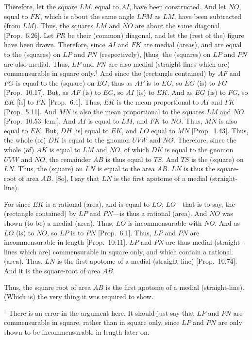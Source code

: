 \begin{Parallel}{}{}
{Therefore, let the square $LM$, equal to $AI$, have been constructed.
And let $NO$, equal to $FK$, which is about the
same angle $LPM$ as $LM$, have been subtracted (from $LM$).
Thus, the squares $LM$ and $NO$ are about the same diagonal
[Prop.~6.26]. Let $PR$ be their (common) diagonal, and
let the (rest of the) figure have been drawn. Therefore, since $AI$ and $FK$
are medial (areas), and are equal to the (squares) on $LP$ and $PN$
(respectively), [thus] the (squares) on $LP$ and $PN$ are also medial.
Thus, $LP$ and $PN$ are  also medial (straight-lines which are)
commensurable in square only.$^\dag$ And since the (rectangle contained) by
$AF$ and $FG$ is equal to the (square) on $EG$, thus as $AF$ is to $EG$, so $EG$ (is) to $FG$ [Prop.~10.17]. But, as
$AF$ (is) to $EG$, so $AI$ (is) to $EK$. And as $EG$ (is) to $FG$, so
$EK$ [is] to $FK$ [Prop.~6.1]. Thus, $EK$ is the mean proportional to $AI$ and $FK$ [Prop.~5.11].
And $MN$ is also the mean proportional to the squares $LM$ and $NO$ [Prop.~10.53~lem.]. 
And $AI$ is equal to $LM$, and $FK$ to $NO$. 
Thus, $MN$ is also equal to
$EK$. But, $DH$ [is] equal to $EK$, and $LO$ equal to $MN$ [Prop.~1.43]. Thus, the whole  (of) $DK$ is equal to
the gnomon $UVW$ and $NO$. Therefore, since the whole (of) $AK$
is equal to $LM$ and $NO$, of which $DK$ is equal to the
gnomon $UVW$ and $NO$,  the remainder $AB$ is thus equal to $TS$.
And $TS$ is the (square) on $LN$. Thus, the (square) on $LN$
is equal to the area $AB$. $LN$ is thus the square-root of area $AB$.
[So], I say that $LN$ is the first apotome of a medial (straight-line).

For since $EK$ is a rational (area), and is equal to $LO$, $LO$---that is to
say, the (rectangle contained) by $LP$ and $PN$---is thus
a rational (area). And $NO$ was shown (to be) a medial (area). Thus,
$LO$ is incommensurable  with $NO$. And as $LO$ (is) to $NO$,
so $LP$ is to $PN$ [Prop.~6.1]. Thus,  $LP$ and
$PN$ are incommensurable in length [Prop.~10.11]. 
$LP$ and $PN$ are thus medial (straight-lines which are) commensurable
in square only, and which contain a rational (area). Thus, $LN$ is the
first apotome of a medial (straight-line) [Prop.~10.74]. And it is the square-root of area $AB$.

Thus, the square root of area $AB$ is the first apotome of a medial (straight-line). (Which is) the very thing it was required to show.}
\end{Parallel}
{\footnotesize\noindent$^\dag$ There is an error in the argument here. It should just say that $LP$ and $PN$ are commensurable in square,
rather than in square only, since $LP$ and $PN$ are only shown
to be incommensurable in length later on.}

